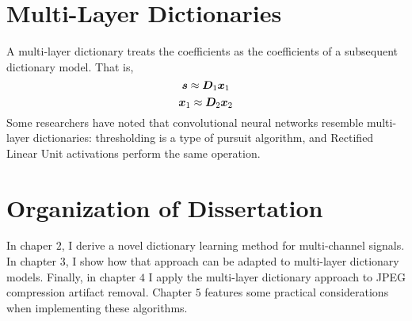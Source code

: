 \section{Multi-Layer Dictionaries}
A multi-layer dictionary treats the coefficients as the coefficients of a subsequent dictionary model. That is,
\begin{equation}
\bm{s} \approx \bm{D}_1\bm{x}_1
\end{equation}
\begin{equation}
\bm{x}_1 \approx \bm{D}_2\bm{x}_2
\end{equation}
Some researchers have noted that convolutional neural networks resemble multi-layer dictionaries: thresholding is a type of pursuit algorithm, and Rectified Linear Unit activations perform the same operation.


\section{Organization of Dissertation}
In chaper $2$, I derive a novel dictionary learning method for multi-channel signals. In chapter $3$, I show how that approach can be adapted to multi-layer dictionary models.  Finally, in chapter $4$ I apply the multi-layer dictionary approach to JPEG compression artifact removal. Chapter $5$ features some practical considerations when implementing these algorithms.




